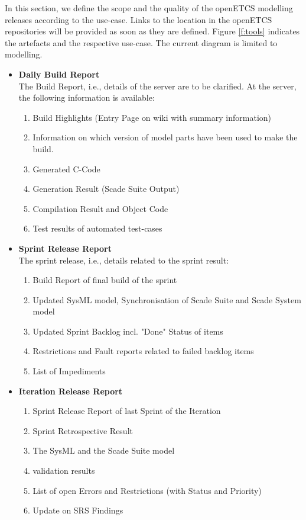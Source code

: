 \documentclass{template/openetcs_report}
\begin{document}
\begin{description}
In this section, we define the scope and the quality of the openETCS modelling releases according to the use-case. Links to the location in the openETCS repositories will be provided as soon as they are defined.
Figure \ref{f:tools} indicates the artefacts and the respective use-case. The current diagram is limited to modelling.


\begin{itemize}
\item \textbf{Daily Build Report}\\
The Build Report, i.e., details of the server are to be clarified. At the server, the following information is available:

\begin{enumerate}
\item Build Highlights (Entry Page on wiki with summary information)
\item Information on which version of model parts have been used to make the build.
\item Generated C-Code
\item Generation Result (Scade Suite Output)
\item Compilation Result and Object Code
\item Test results of automated test-cases 
\end{enumerate}

\item \textbf{Sprint Release Report}\\
The sprint release, i.e., details related to the sprint result:
\begin{enumerate}
\item Build Report of final build of the sprint
\item Updated SysML model, Synchronisation of Scade Suite and Scade System model 
\item Updated Sprint Backlog incl. "Done" Status of items
\item Restrictions and Fault reports related to failed backlog items
\item List of Impediments
\end{enumerate}

\item \textbf{Iteration Release Report}
\begin{enumerate}
\item Sprint Release Report of last Sprint of the Iteration
\item Sprint Retrospective Result
\item The SysML and the Scade Suite model
\item validation results
\item List of open Errors and Restrictions (with Status and Priority)
\item Update on SRS Findings
\end{enumerate}


\end{itemize}
\end{description}
\end{document}
